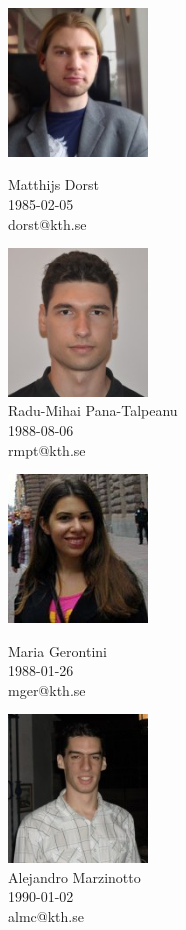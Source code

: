 \addtolength{\columnwidth}{50px}
\begin{figure}[h]
	\center
  	\includegraphics[width=140px]{images/md.jpg}\caption*{Matthijs Dorst\\1985-02-05\\dorst@kth.se}
	\vspace{10px}
	\includegraphics[width=140px]{images/radu.jpg}\caption*{Radu-Mihai Pana-Talpeanu\\1988-08-06\\rmpt@kth.se}
\end{figure}

\addtolength{\columnwidth}{-50px}
\begin{figure}[h]
	\center
  	\includegraphics[width=140px]{images/mary.jpg}\caption*{Maria Gerontini \\1988-01-26\\mger@kth.se}
	\vspace{10px}
	\includegraphics[width=140px]{images/a.jpg}\caption*{Alejandro Marzinotto\\1990-01-02\\almc@kth.se}
\end{figure}

\newpage
\clearpage
